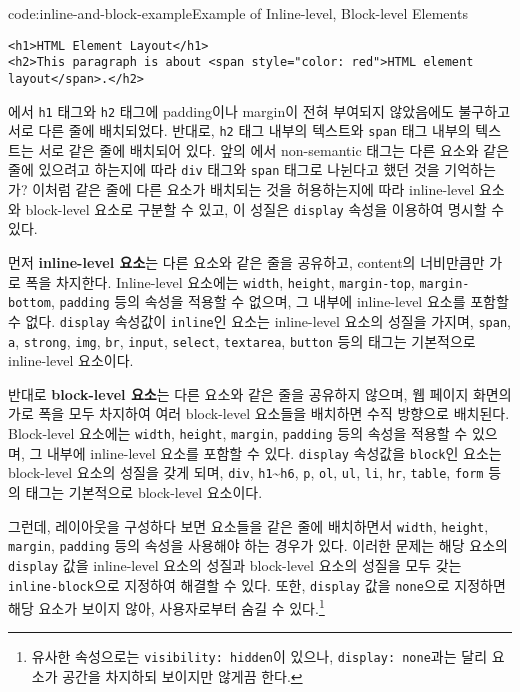 \begin{codeenv}{code:inline-and-block-example}{Example of Inline-level, Block-level Elements}\begin{verbatim}
<h1>HTML Element Layout</h1>
<h2>This paragraph is about <span style="color: red">HTML element layout</span>.</h2>
\end{verbatim}
\end{codeenv}

에서 \texttt{h1} 태그와 \texttt{h2} 태그에 padding이나 margin이 전혀 부여되지 않았음에도 불구하고 서로 다른 줄에 배치되었다. 반대로, \texttt{h2} 태그 내부의 텍스트와 \texttt{span} 태그 내부의 텍스트는 서로 같은 줄에 배치되어 있다. 앞의 에서 non-semantic 태그는 다른 요소와 같은 줄에 있으려고 하는지에 따라 \texttt{div} 태그와 \texttt{span} 태그로 나뉜다고 했던 것을 기억하는가? 이처럼 같은 줄에 다른 요소가 배치되는 것을 허용하는지에 따라 inline-level 요소와 block-level 요소로 구분할 수 있고, 이 성질은 \texttt{display} 속성을 이용하여 명시할 수 있다.

먼저 \textbf{inline-level 요소}는 다른 요소와 같은 줄을 공유하고, content의 너비만큼만 가로 폭을 차지한다. Inline-level 요소에는 \texttt{width}, \texttt{height}, \texttt{margin-top}, \texttt{margin-bottom}, \texttt{padding} 등의 속성을 적용할 수 없으며, 그 내부에 inline-level 요소를 포함할 수 없다. \texttt{display} 속성값이 \texttt{inline}인 요소는 inline-level 요소의 성질을 가지며, \texttt{span}, \texttt{a}, \texttt{strong}, \texttt{img}, \texttt{br}, \texttt{input}, \texttt{select}, \texttt{textarea}, \texttt{button} 등의 태그는 기본적으로 inline-level 요소이다. 

반대로 \textbf{block-level 요소}는 다른 요소와 같은 줄을 공유하지 않으며, 웹 페이지 화면의 가로 폭을 모두 차지하여 여러 block-level 요소들을 배치하면 수직 방향으로 배치된다. Block-level 요소에는 \texttt{width}, \texttt{height}, \texttt{margin}, \texttt{padding} 등의 속성을 적용할 수 있으며, 그 내부에 inline-level 요소를 포함할 수 있다. \texttt{display} 속성값을 \texttt{block}인 요소는 block-level 요소의 성질을 갖게 되며, \texttt{div}, \texttt{h1}\textasciitilde\texttt{h6}, \texttt{p}, \texttt{ol}, \texttt{ul}, \texttt{li}, \texttt{hr}, \texttt{table}, \texttt{form} 등의 태그는 기본적으로 block-level 요소이다.

그런데, 레이아웃을 구성하다 보면 요소들을 같은 줄에 배치하면서 \texttt{width}, \texttt{height}, \texttt{margin}, \texttt{padding} 등의 속성을 사용해야 하는 경우가 있다. 이러한 문제는 해당 요소의 \texttt{display} 값을 inline-level 요소의 성질과 block-level 요소의 성질을 모두 갖는 \texttt{inline-block}으로 지정하여 해결할 수 있다. 또한, \texttt{display} 값을 \texttt{none}으로 지정하면 해당 요소가 보이지 않아, 사용자로부터 숨길 수 있다.\footnote{유사한 속성으로는 \texttt{visibility: hidden}이 있으나, \texttt{display: none}과는 달리 요소가 공간을 차지하되 보이지만 않게끔 한다.}
 
